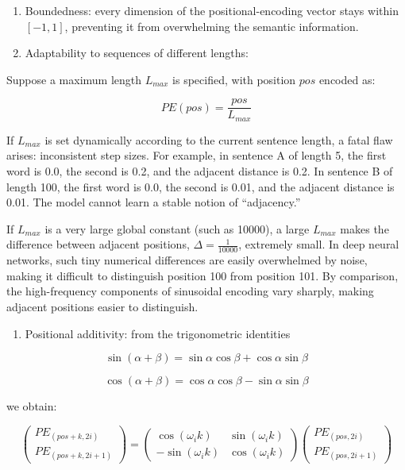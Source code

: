 \begin{enumerate}
\def\labelenumi{(\arabic{enumi})}
\item
  Boundedness: every dimension of the positional-encoding vector stays within \([-1,1]\), preventing it from overwhelming the semantic information.
\item
{}
  Adaptability to sequences of different lengths:
\end{enumerate}

Suppose a maximum length \(L_{max}\) is specified, with position \(pos\) encoded as:

\[
PE(pos)=\frac{pos}{L_{max}}
\]

If \(L_{max}\) is set dynamically according to the current sentence length, a fatal flaw arises: inconsistent step sizes. For example, in sentence A of length 5, the first word is 0.0, the second is 0.2, and the adjacent distance is 0.2. In sentence B of length 100, the first word is 0.0, the second is 0.01, and the adjacent distance is 0.01. The model cannot learn a stable notion of ``adjacency.''

If \(L_{max}\) is a very large global constant (such as 10000), a large \(L_{max}\) makes the difference between adjacent positions, \(\Delta=\frac{1}{10000}\), extremely small. In deep neural networks, such tiny numerical differences are easily overwhelmed by noise, making it difficult to distinguish position 100 from position 101. By comparison, the high-frequency components of sinusoidal encoding vary sharply, making adjacent positions easier to distinguish.

\begin{enumerate}
\def\labelenumi{(\arabic{enumi})}
\setcounter{enumi}{2}
\tightlist
\item
  Positional additivity: from the trigonometric identities
\end{enumerate}

\[
\sin(\alpha+\beta)=\sin\alpha\cos\beta+\cos\alpha\sin\beta
\]

\[
\cos(\alpha+\beta)=\cos\alpha\cos\beta-\sin\alpha\sin\beta
\]

we obtain:

\[
\begin{pmatrix}
PE_{(pos+k,2i)} \\
PE_{(pos+k,2i+1)}
\end{pmatrix}
=
\begin{pmatrix}
\cos(\omega_i k) & \sin(\omega_i k) \\
-\sin(\omega_i k) & \cos(\omega_i k)
\end{pmatrix}
\begin{pmatrix}
PE_{(pos,2i)} \\
PE_{(pos,2i+1)}
\end{pmatrix}
\]

